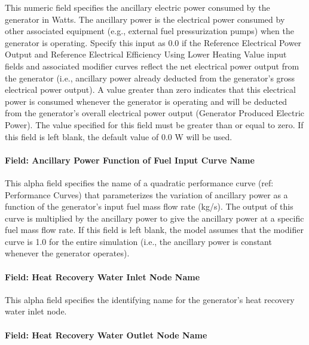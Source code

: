 This numeric field specifies the ancillary electric power consumed by the generator in Watts. The ancillary power is the electrical power consumed by other associated equipment (e.g., external fuel pressurization pumps) when the generator is operating. Specify this input as 0.0 if the Reference Electrical Power Output and Reference Electrical Efficiency Using Lower Heating Value input fields and associated modifier curves reflect the net electrical power output from the generator (i.e., ancillary power already deducted from the generator's gross electrical power output). A value greater than zero indicates that this electrical power is consumed whenever the generator is operating and will be deducted from the generator's overall electrical power output (Generator Produced Electric Power). The value specified for this field must be greater than or equal to zero. If this field is left blank, the default value of 0.0 W will be used.

\paragraph{Field: Ancillary Power Function of Fuel Input Curve Name}\label{field-ancillary-power-function-of-fuel-input-curve-name}

This alpha field specifies the name of a quadratic performance curve (ref: Performance Curves) that parameterizes the variation of ancillary power as a function of the generator's input fuel mass flow rate (kg/s). The output of this curve is multiplied by the ancillary power to give the ancillary power at a specific fuel mass flow rate. If this field is left blank, the model assumes that the modifier curve is 1.0 for the entire simulation (i.e., the ancillary power is constant whenever the generator operates).

\paragraph{Field: Heat Recovery Water Inlet Node Name}\label{field-heat-recovery-water-inlet-node-name}

This alpha field specifies the identifying name for the generator's heat recovery water inlet node.

\paragraph{Field: Heat Recovery Water Outlet Node Name}\label{field-heat-recovery-water-outlet-node-name}

